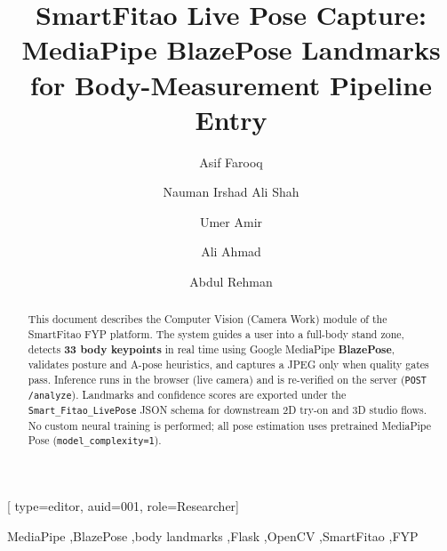 \documentclass[a4paper,fleqn]{cas-sc}
\begin{document}
\let\WriteBookmarks\relax


\title[mode=title]{SmartFitao Live Pose Capture: MediaPipe BlazePose Landmarks for Body-Measurement Pipeline Entry}


\author[1]{Asif Farooq}[%
  type=editor,
  auid=001,
  role=Researcher]
\cormark[1]

\author[2]{Nauman Irshad Ali Shah}

\author[3]{Umer Amir}

\author[4]{Ali Ahmad}

\author[5]{Abdul Rehman}



\begin{abstract}
This document describes the Computer Vision (Camera Work) module of the SmartFitao FYP platform. The system guides a user into a full-body stand zone, detects \textbf{33 body keypoints} in real time using Google MediaPipe \textbf{BlazePose}, validates posture and A-pose heuristics, and captures a JPEG only when quality gates pass. Inference runs in the browser (live camera) and is re-verified on the server (\texttt{POST /analyze}). Landmarks and confidence scores are exported under the \texttt{Smart\_Fitao\_LivePose} JSON schema for downstream 2D try-on and 3D studio flows. No custom neural training is performed; all pose estimation uses pretrained MediaPipe Pose (\texttt{model\_complexity=1}).
\end{abstract}

\begin{keywords}
MediaPipe \sep BlazePose \sep body landmarks \sep Flask \sep OpenCV \sep SmartFitao \sep FYP
\end{keywords}
\end{document}
